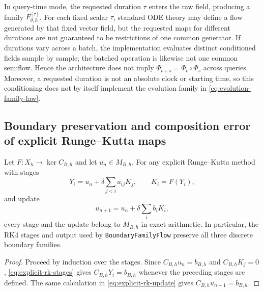 \begin{remark}\label{rem:query-time-family}
In query-time mode, the requested duration $\tau$ enters the raw field, producing a family $F_{\theta,h}^{[\tau]}$.  For each fixed scalar $\tau$, standard ODE theory may define a flow generated by that fixed vector field, but the requested maps for different durations are not guaranteed to be restrictions of one common generator.  If durations vary across a batch, the implementation evaluates distinct conditioned fields sample by sample; the batched operation is likewise not one common semiflow.  Hence the architecture does not imply $\Phi_{t+s}=\Phi_t\circ\Phi_s$ across queries.  Moreover, a requested duration is not an absolute clock or starting time, so this conditioning does not by itself implement the evolution family in \eqref{eq:evolution-family-law}.
\end{remark}

\subsection{Boundary preservation and composition error of explicit Runge--Kutta maps}

\begin{proposition}\label{prop:explicit-rk-boundary}
Let $F:X_h\to\ker C_{B,h}$ and let $u_n\in M_{B,h}$.  For any explicit Runge--Kutta method with stages
\begin{equation}\label{eq:explicit-rk-stages}
Y_i=u_n+\delta\sum_{j<i}a_{ij}K_j,\qquad K_i=F(Y_i),
\end{equation}
and update
\begin{equation}\label{eq:explicit-rk-update}
u_{n+1}=u_n+\delta\sum_i b_iK_i,
\end{equation}
every stage and the update belong to $M_{B,h}$ in exact arithmetic.  In particular, the RK4 stages and output used by \texttt{BoundaryFamilyFlow} preserve all three discrete boundary families.
\end{proposition}

\begin{proof}
Proceed by induction over the stages.  Since $C_{B,h}u_n=b_{B,h}$ and $C_{B,h}K_j=0$, \eqref{eq:explicit-rk-stages} gives $C_{B,h}Y_i=b_{B,h}$ whenever the preceding stages are defined.  The same calculation in \eqref{eq:explicit-rk-update} gives $C_{B,h}u_{n+1}=b_{B,h}$.
\end{proof}

